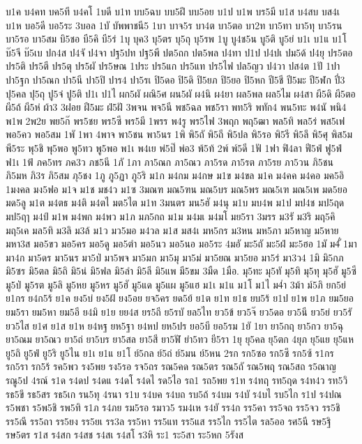 {บ1ค
บ4คท
บค5ที
บ4คโ
1บดี
บ1ท
บบ5ฉบ
บบ5ฝึ
บบ5อย
บ1ป
บ1พ
บร5มี
บ1ส
บ4สบ
บส4เ
บ1ห
บอ5ดี
บอ5ระ
3บอล
1บั
บัพพาชนี5
1บา
บาจ5ร
บา4ต
บา5ตอ
บา2ท
บา5ทา
บา5ทุ
บา5รน
บา5รอ
บา5สม
บิ5ชอ
บี5คิ
บี5ร่
1บุ
บุค3
บุ5ตร
บุ5ถุ
บุ5รพ
1บู
บู4ช5น
บู5ติ
บู5ย่
บ1เ
บ1แ
บ1โ
บ๊5จี
บ๊5เบ
ปก4ส
ป4จั
ป4จา
ปฐ5ปท
ปฐ5พี
ปต5ถก
ปต5พล
ป4ทา
ป1ป
ป4ปเ
ปม5ด้
ป4ยุ
ปร5ตอ
ปร5ติ
ปร5ตี
ปร5ตุ
ปร5ผั
ปร5ษณ
1ประ
ปร5แก
ปร5แท
ปร5ไฟ
ปล5ญว
ป4วา
ปส4ต
1ปั
1ปา
ปา5ฐก
ปา5ณก
ปา5นี
ปา5ปิ
ปาร4
ปา5รเ
ปิ5ดอ
ปิ5ดิ
ปิ5ยภ
ปิ5ยอ
ปิ5หก
ปี5ชี
ปี5มะ
ปี5ฬก
ปี่3
ปุ5คล
ปุ5ถุ
ปู5จ๋
ปู5ติ
ป1เ
ป1ไ
ผก5ผั
ผณิ5ศ
ผน5ผั
ผ4นิ
ผ4ยา
ผล5พล
ผล5ไม
ผ4สา
ผี5ดิ
ผี5ตอ
ผี5ถ้
ผี5ห่
ผ้า3
3ฝอย
ฝี5มะ
ฝ่5ฝั
3พจน
พจ5นี
พช5ฉล
พช5รา
พท5ริ
พทัก4
พน5ทะ
พ4นั
พนิ4
พ1พ
2พ2ย
พย5ก๊
พร5ชย
พร5ซี
พร5มี
1พรร
พ4รู
พร5ไฟ
3พฤก
พฤ5ฒา
พล5ทิ
พล5ร่
พส5เฟ
พอ5คว
พอ5สม
1พั
1พา
4พาจ
พา5ชน
พา5นร
1พิ
พิ5ถั
พิ5ถี
พิ5ปล
พิ5รอ
พิ5รี
พิ5ลึ
พิ5ศุ
พิส5ม
พี5ระ
พุ5ชิ
พุ5พอ
พู5ทว
พู5พอ
พ1เ
พ4เย
พ่5ป๊
พ่อ3
พ้5ท้
2พ์
พ์5ดี
1ฟั
1ฟา
ฟิ4ลา
ฟี5ฟ่
ฟู5ฟ่
ฟ1เ
1ฟ้
ภค5ทร
ภค3ว
ภช5นี
1ภั
1ภา
ภา5ณก
ภา5ณว
ภา5รด
ภา5รต
ภา5รย
ภา5วน
ภิ5ชน
ภิ5มห
ภิ3ร
ภิ5สม
ภุ5ชง
1ภู
ภู5ฏา
ภู5ริ
ม1ก
ม4กม
ม4กษ
ม1ข
ม4ขล
ม1ค
ม4คค
ม4คอ
มค5อิ
1มงคล
มง5ฟอ
ม1จ
ม1ช
มช4ว
ม1ซ
3มณฑ
มณ5ฑน
มณ5บร
มณ5พร
มณ5เฑ
มณ5เพ
มด5ยอ
มด5ลู
ม1ต
ม4ตธ
ม4ติ
ม4ตไ
มต5ไต
ม1ท
3มนตร
มน5ฮั
ม4นุ
ม1บ
มบ4พ
ม1ป
มป4ช
มป5ฤด
มป5ฤๅ
ม4ป์
ม1พ
ม4พก
ม4พว
ม1ภ
มภ5กถ
ม1ม
ม4มเ
ม4มโ
มย5รา
3มรร
ม3รั
ม3ริ
มฤ5คิ
มฤ5เค
มล5ทิ
ม3ลิ
ม3ล้
ม1ว
มว5มอ
ม4วล
ม1ส
มส4เ
มห5กร
ม3หน
มห5ภา
ม5หาญ
ม5หาย
มหา3ส
มอ5ขว
มอ5คร
มอ5ดู
มอ5ตำ
มอ5นว
มอ5นอ
มอ5ระ
4มอั
มะ5ถั
มะ5ฝ่
มะ5ฮอ
1มั
ม4ั่
1มา
มา4ก
มา5ดร
มา5นร
มา5ป่
มา5พจ
มา5มก
มา5มุ
มา5ม่
มา5ยณ
มา5ยอ
มา5ร่
มา3ว4
1มิ
มิ5กภ
มิ5ซร
มิ5ตล
มิ5ถิ
มิ5น่
มิ5ฟล
มิ5ลำ
มิ5ลี
มิ5แพ
มี5ขม
3มืด
1มือ.
มุ5ทะ
มุ5ทั
มุ5ทิ
มุ5ทุ
มุ5ฮั
มู5ซี
มู5ป่
มู5รต
มู5ลิ
มู5หย
มู5หร
มู5ฮั
มู5แด
มู5แผ
มู5แฮ
ม1เ
ม1แ
ม1โ
ม1ไ
ม4่า
3ม้า
ม์5ภิ
ยก5ย่
ย1กร
ย4ก5ร้
ย1ค
ยง5บ่
ยง5ฝ้
ยง5อย
ยจ5คร
ยด5ย้
ย1ต
ย1ท
ย1ธ
ยบ5ร้
ย1ป
ย1พ
ย1ภ
ยม5ยอ
ยม5รา
ยม5หา
ยม5อี
ย4มิ
ย1ย
ยย4ส
ยร5ถี
ย5รบั
ยล5ไท
ยว5ข้
ยว5จ๊
ยว5ดอ
ยว5นี
ยว5ย่
ยว5รั
ยว5ไส
ย1ศ
ย1ส
ย1ห
ย4หฐ
ยห5ฐา
ย4หป
ยห5ปร
ยอ5บี
ยอ5รม
1ยั
1ยา
ยา5กฤ
ยา5กว
ยา5ฉุ
ยา5ณม
ยา5ณว
ยา5ถ่
ยา5บร
ยา5สล
ยา5สี
ยา5ฬั
ยำ5ทว
ยี5รา
1ยุ
ยุ5คล
ยุ5ตก
4ยุภ
ยุ5แย
ยุ5แห
ยู5ถิ
ยู5ฟ่
ยู5ริ
ยู5ไน
ย1เ
ย1แ
ย1โ
ย์5กล
ย์5ถ่
ย์5มน
ย์5หน
2รก
รก5ซอ
รก5ซึ
รก5ซ้
ร1กร
รก5รา
รก5ร้
รค5พว
รง5พย
รง5รอ
รจ5ถร
รณ5คด
รณ5ตร
รณ5ถั
รณ5พฤ
รณ5สถ
ร5ณาญ
รณู5ป
4รณ์
ร1ด
ร4ดป
ร4ดแ
ร4ดโ
ร4ดไ
รด5ไอ
รถ1
รถ5พย
ร1ท
ร4ทฤ
รท5ฤด
ร4ท4ว
รท5วิ
รธ5ขึ
รธ5สร
รธ5เก
รน5ทุ
4รนา
ร1บ
ร4บค
ร4บถ
รบ5ถ้
ร4บม
ร4บั
ร4บไ
รบ5ไก
ร1ป
ร4ปณ
ร5พชา
ร5พ5ชิ
รพ5ทิ
ร1ภ
ร4ภย
รม5รอ
รมาว5
รม4เห
ร4ยั
รร4ก
รร5คา
รร5จถ
รร5จว
รร5ชิ
รร5ณึ
รร5ถา
รร5ยง
รร5ยเ
รร3ล
รร5หา
รร5แท
รร5แส
รร5ไก
รร5ไต
รล5ออ
รศ5นี
รษ5ฐิ
รษ5ตร
ร1ส
ร4สก
ร4สช
ร4สเ
ร4สโ
ร3หิ
ระ1
ระ5สา
ระ5หก
5รังส
}
